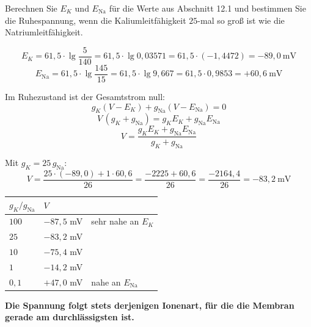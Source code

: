 \begin{aufgabe}
Berechnen Sie $E_K$ und $E_{\mathrm{Na}}$ für die Werte aus Abschnitt 12.1 und bestimmen Sie die Ruhespannung, wenn die Kaliumleitfähigkeit $25$-mal so groß ist wie die Natriumleitfähigkeit.

\loesung
{}
\[ E_K = 61{,}5 \cdot \lg\frac{5}{140} = 61{,}5 \cdot \lg 0{,}03571 = 61{,}5 \cdot (-1{,}4472) = -89{,}0\ \mathrm{mV} \]
\[ E_{\mathrm{Na}} = 61{,}5 \cdot \lg\frac{145}{15} = 61{,}5 \cdot \lg 9{,}667 = 61{,}5 \cdot 0{,}9853 = +60{,}6\ \mathrm{mV} \]

Im Ruhezustand ist der Gesamtstrom null:
\[ g_K(V-E_K) + g_{\mathrm{Na}}(V-E_{\mathrm{Na}}) = 0 \]
\[ V\,(g_K+g_{\mathrm{Na}}) = g_KE_K + g_{\mathrm{Na}}E_{\mathrm{Na}} \]
\[ V = \frac{g_KE_K + g_{\mathrm{Na}}E_{\mathrm{Na}}}{g_K+g_{\mathrm{Na}}} \]

\begin{center}
\begin{minipage}{0.88\textwidth}
\end{minipage}
\end{center}

Mit $g_K = 25\,g_{\mathrm{Na}}$:
\[ V = \frac{25 \cdot (-89{,}0) + 1 \cdot 60{,}6}{26} = \frac{-2225 + 60{,}6}{26} = \frac{-2164{,}4}{26} = -83{,}2\ \mathrm{mV} \]

\begin{center}
\renewcommand{\arraystretch}{1.45}
\begin{tabular}{@{}P{2.4cm}P{2.4cm}P{2.6cm}@{}}
\toprule
$g_K/g_{\mathrm{Na}}$ & $V$ & \\
\midrule
$100$ & $-87{,}5$ mV & sehr nahe an $E_K$\\
$25$ & $-83{,}2$ mV & \\
$10$ & $-75{,}4$ mV & \\
$1$ & $-14{,}2$ mV & \\
$0{,}1$ & $+47{,}0$ mV & nahe an $E_{\mathrm{Na}}$\\
\bottomrule
\end{tabular}
\end{center}

\begin{center}
\begin{minipage}{0.9\textwidth}
\textbf{Die Spannung folgt stets derjenigen Ionenart, für die die Membran gerade am durchlässigsten ist.}
\end{minipage}
\end{center}


\end{aufgabe}

